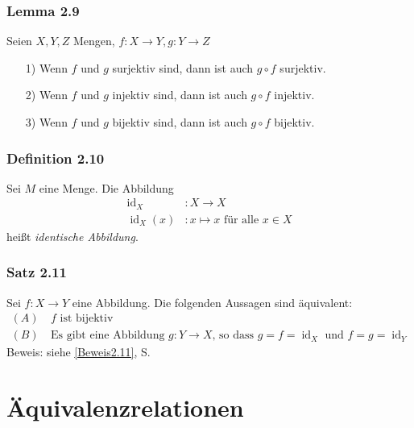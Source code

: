 \documentclass[a5paper, 10pt]{book}
\DeclareMathOperator{\id}{id}
\begin{document}
			\subsubsection{Lemma 2.9}
				Seien $X, Y, Z$ Mengen, $f: X \rightarrow Y, g: Y \rightarrow Z$
				\begin{itemize}
					\item[1)] Wenn $f$ und $g$ surjektiv sind, dann ist auch $g\circ f$ surjektiv.
					\item[2)] Wenn $f$ und $g$ injektiv sind, dann ist auch $g\circ f$ injektiv.
					\item[3)] Wenn $f$ und $g$ bijektiv sind, dann ist auch $g\circ f$ bijektiv. 
				\end{itemize}
			
			\subsubsection{Definition 2.10}
				Sei $M$ eine Menge. Die Abbildung
				\begin{align}
					\id_X &: X \rightarrow X\\
					\id_X (x) &: x \mapsto x \text{ für alle } x\in X
				\end{align}
				heißt \emph{identische Abbildung}.
				
			\subsubsection{Satz 2.11}
				Sei $f: X \rightarrow Y$ eine Abbildung. Die folgenden Aussagen sind äquivalent:
				\begin{align}
					 (A) &\ f \text{ ist bijektiv}\\
					 (B) &\ \text{Es gibt eine Abbildung }g: Y \rightarrow X\text{, so dass }g=f=\id_X\text{ und }f=g=\id_Y
				\end{align}
				Beweis: siehe \ref{Beweis2.11}, S. \pageref{Beweis2.11}
	
		\section{Äquivalenzrelationen}
			
\end{document}
